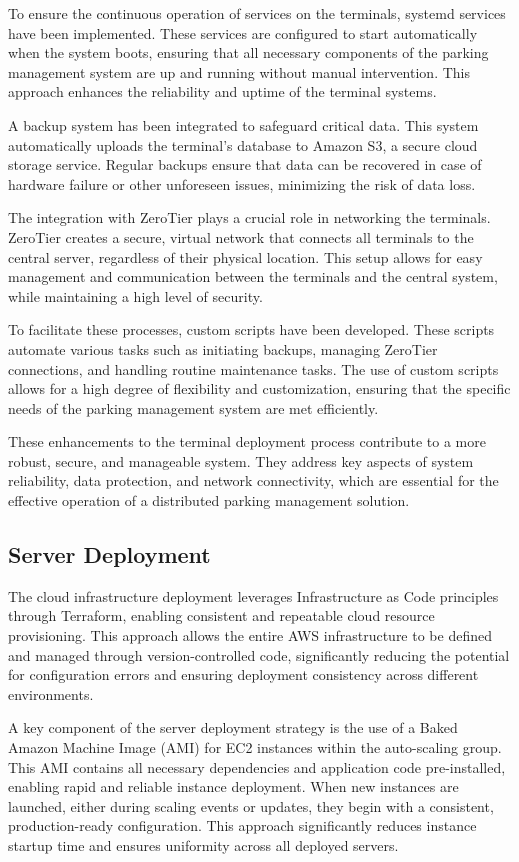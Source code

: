 To ensure the continuous operation of services on the terminals, systemd services have been implemented. These services are configured to start automatically when the system boots, ensuring that all necessary components of the parking management system are up and running without manual intervention. This approach enhances the reliability and uptime of the terminal systems.

A backup system has been integrated to safeguard critical data. This system automatically uploads the terminal's database to Amazon S3, a secure cloud storage service. Regular backups ensure that data can be recovered in case of hardware failure or other unforeseen issues, minimizing the risk of data loss.

The integration with ZeroTier plays a crucial role in networking the terminals. ZeroTier creates a secure, virtual network that connects all terminals to the central server, regardless of their physical location. This setup allows for easy management and communication between the terminals and the central system, while maintaining a high level of security.

To facilitate these processes, custom scripts have been developed. These scripts automate various tasks such as initiating backups, managing ZeroTier connections, and handling routine maintenance tasks. The use of custom scripts allows for a high degree of flexibility and customization, ensuring that the specific needs of the parking management system are met efficiently.

These enhancements to the terminal deployment process contribute to a more robust, secure, and manageable system. They address key aspects of system reliability, data protection, and network connectivity, which are essential for the effective operation of a distributed parking management solution.

\subsection{Server Deployment}

The cloud infrastructure deployment leverages Infrastructure as Code principles through Terraform, enabling consistent and repeatable cloud resource provisioning. This approach allows the entire AWS infrastructure to be defined and managed through version-controlled code, significantly reducing the potential for configuration errors and ensuring deployment consistency across different environments.

A key component of the server deployment strategy is the use of a Baked Amazon Machine Image (AMI) for EC2 instances within the auto-scaling group. This AMI contains all necessary dependencies and application code pre-installed, enabling rapid and reliable instance deployment. When new instances are launched, either during scaling events or updates, they begin with a consistent, production-ready configuration. This approach significantly reduces instance startup time and ensures uniformity across all deployed servers.

